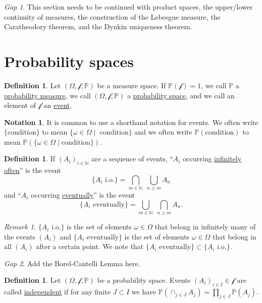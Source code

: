 \documentclass[11pt]{article}
\newcommand{\col}[1]{\mathscr{#1}}
\newcommand{\p}{\mathbb{P}}
\newcommand{\defname}[1]{\underline{#1}}
\newcommand{\NN}{\mathbb{N}}
\theoremstyle{theorem}
\theoremstyle{definition}
\newtheorem{definition}[theorem]{Definition}
\newtheorem{notation}[theorem]{Notation}
\theoremstyle{remark}
\newtheorem*{remark}{Remark}
\theoremstyle{step}
\theoremstyle{gap}
\newtheorem*{gap}{Gap}
\begin{document}
\begin{gap} This section needs to be continued with product spaces, the upper/lower continuity of measures, the construction of the Lebesgue measure, the Caratheodory theorem, and the Dynkin uniqueness theorem.\end{gap}

\section{Probability spaces}

\begin{definition}
Let \((\Omega, \col{f}, \p)\) be a measure space. If \(\p(\col{f}) = 1\), we call \(\p\) a \defname{probability measure}, we call \((\Omega, \col{f}, \p)\) a \defname{probability space}, and we call an element of \(\col{f}\) an \defname{event}.
\end{definition}

\begin{notation}
It is common to use a shorthand notation for events. We often write \(\{\text{condition}\}\) to mean \(\{\omega \in \Omega\;|\;\text{ condition}\}\) and we often write \(\p(\text{condition})\) to mean \(\p\left(\{\omega \in \Omega\;|\;\text{condition}\}\right)\).
\end{notation}

\begin{definition}
If \((A_i)_{i \in \NN}\) are a sequence of events, ``\(A_i\) occurring \defname{infinitely often}'' is the event
\[\{A_i \text{ i.o.}\} = \bigcap_{m \in \NN} \;\bigcup_{n \geq m} A_n\]
and ``\(A_i\) occurring \defname{eventually}'' is the event
\[\{A_i \text{ eventually}\} = \bigcup_{m \in \NN} \;\bigcap_{n \geq m} A_n.\]
\end{definition}

\begin{remark}
\(\{A_i \text{ i.o.}\}\) is the set of elements \(\omega \in \Omega\) that belong in infinitely many of the events \((A_i)\) and \(\{A_i \text{ eventually}\}\) is the set of elements \(\omega \in \Omega\) that belong in all \((A_i)\) after a certain point. We note that \(\{A_i \text{ eventually}\} \subset \{A_i \text{ i.o.}\}\).
\end{remark}

\begin{gap} Add the Borel-Cantelli Lemma here.\end{gap}

\begin{definition}
Let \((\Omega, \col{f}, \p)\) be a probability space. Events \((A_i)_{i \in I} \in \col{f}\) are called \defname{independent} if for any finite \(J \subset I\) we have \(\p\left(\cap_{j \in J} A_j\right) = \prod_{j \in J} \p\left(A_j\right)\).
\end{definition}
\end{document}
